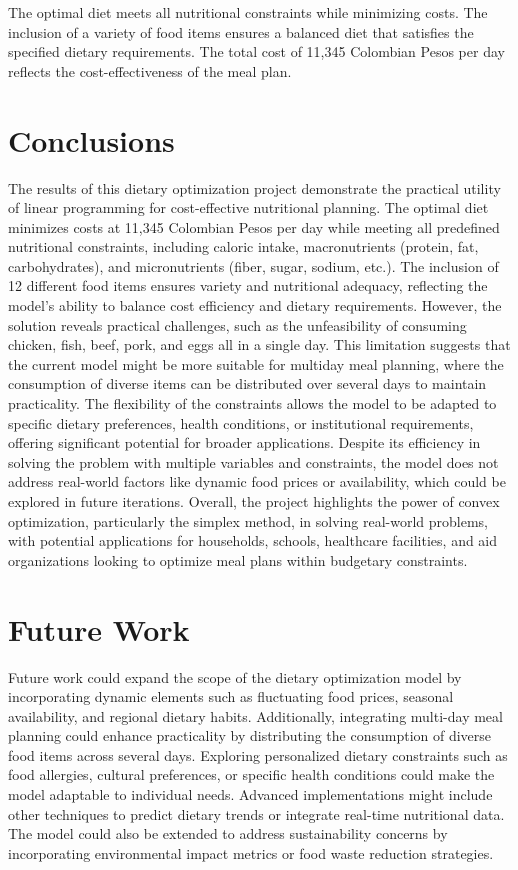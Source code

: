 \documentclass[10pt]{article}
\begin{document}
The optimal diet meets all nutritional constraints while minimizing costs. The inclusion of a variety of food items ensures a balanced diet that satisfies the specified dietary requirements. The total cost of 11,345 Colombian Pesos per day reflects the cost-effectiveness of the meal plan.\\

\section{Conclusions}

The results of this dietary optimization project demonstrate the practical utility of linear programming for cost-effective nutritional planning. 
The optimal diet minimizes costs at 11,345 Colombian Pesos per day while meeting all predefined nutritional constraints, including caloric intake, macronutrients 
(protein, fat, carbohydrates), and micronutrients (fiber, sugar, sodium, etc.). The inclusion of 12 different food items ensures variety and nutritional adequacy, reflecting 
the model's ability to balance cost efficiency and dietary requirements. However, the solution reveals practical challenges, such as the unfeasibility of consuming chicken, fish,
 beef, pork, and eggs all in a single day. This limitation suggests that the current model might be more suitable for multiday meal planning, where the consumption of diverse items can
  be distributed over several days to maintain practicality. The flexibility of the constraints allows the model to be adapted to specific dietary preferences, health conditions, or
   institutional requirements, offering significant potential for broader applications. Despite its efficiency in solving the problem with multiple variables and constraints, the model does
    not address real-world factors like dynamic food prices or availability, which could be explored in future iterations. Overall, the project highlights the power of convex optimization, 
    particularly the simplex method, in solving real-world problems, with potential applications for households, schools, healthcare facilities, and aid organizations looking to optimize meal plans
     within budgetary constraints.

\section{Future Work}

Future work could expand the scope of the dietary optimization model by incorporating dynamic elements such as fluctuating food prices,
 seasonal availability, and regional dietary habits. Additionally, integrating multi-day meal planning could enhance practicality by distributing the 
 consumption of diverse food items across several days. Exploring personalized dietary constraints such as food allergies, cultural preferences, or specific health
  conditions could make the model adaptable to individual needs. Advanced implementations might include other techniques to predict dietary trends or integrate
   real-time nutritional data. The model could also be extended to address sustainability concerns by incorporating environmental impact metrics or food waste reduction strategies. 
\end{document}
